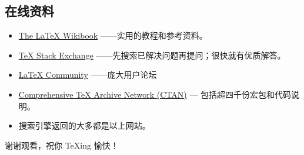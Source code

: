 \documentclass{beamer}
\begin{document}
\subsection{在线资料}
\begin{frame}{\insertsubsection}
\begin{itemize}
\item \href{http://en.wikibooks.org/wiki/LaTeX}{The \LaTeX{} Wikibook} ——实用的教程和参考资料。
\item \href{http://tex.stackexchange.com/}{\TeX{} Stack Exchange} ——先搜索已解决问题再提问；很快就有优质解答。
\item \href{http://www.latex-community.org/}{\LaTeX{} Community} ——庞大用户论坛
\item \href{http://ctan.org/}{Comprehensive \TeX{} Archive Network (CTAN)} ---
包括超四千份宏包和代码说明。
\item 搜索引擎返回的大多都是以上网站。
\end{itemize}
\end{frame}

\begin{frame}
\begin{center}
谢谢观看，祝你 \TeX{}ing 愉快！
\end{center}
\end{frame}
\end{document}
